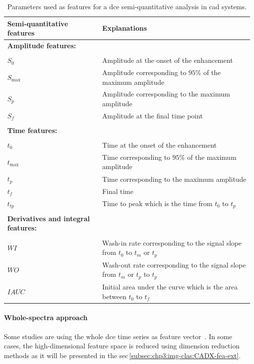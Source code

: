 \begin{table}
  \caption{Parameters used as features for a \acs*{dce} semi-quantitative analysis in \acs*{cad} systems.}
  \scriptsize
  \centering
  \begin{tabularx}{\textwidth}{l X}
    \toprule
    \textbf{Semi-quantitative features} & \textbf{Explanations} \\
    \midrule
    \textbf{Amplitude features:} & \\ \\ [-1.5ex]
    \quad $S_0$ & Amplitude at the onset of the enhancement \\
    \quad $S_{\max}$ & Amplitude corresponding to $95\%$ of the maximum amplitude \\
    \quad $S_{p}$ & Amplitude corresponding to the maximum amplitude \\
    \quad $S_f$ & Amplitude at the final time point \\ \\ [-1.5ex]
    \textbf{Time features:} & \\ \\ [-1.5ex]
    \quad $t_0$ & Time at the onset of the enhancement \\
    \quad $t_{\max}$ & Time corresponding to $95\%$ of the maximum amplitude \\
    \quad $t_{p}$ & Time corresponding to the maximum amplitude \\
    \quad $t_{f}$ & Final time \\
    \quad $t_{tp}$ & Time to peak which is the time from $t_0$ to $t_p$ \\ \\ [-1.5ex]
    \textbf{Derivatives and integral features:} & \\ \\ [-1.5ex]
    \quad $WI$ & Wash-in rate corresponding to the signal slope from $t_0$ to $t_m$ or $t_p$ \\
    \quad $WO$ & Wash-out rate corresponding to the signal slope from $t_m$ or $t_p$ to $t_p$ \\
    \quad $IAUC$ & Initial area under the curve which is the area between $t_0$ to $t_{f}$ \\
    \bottomrule
  \end{tabularx}
\label{tab:semiqua}
\end{table}

\paragraph{Whole-spectra approach}
Some studies are using the whole \ac{dce} time series as feature vector~\cite{Ampeliotis2007,Ampeliotis2008,Tiwari2012,Viswanath2008a,Viswanath2008}.
In some cases, the high-dimensional feature space is reduced using dimension reduction methods as it will be presented in the \acs{sec}\,\ref{subsec:chp3:img-clas:CADX-fea-ext}.

